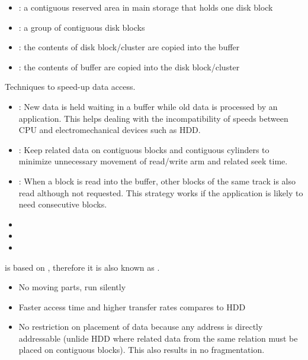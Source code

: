     \begin{itemize}
      \item {}: a contiguous reserved area in main storage that holds one disk block
      \item {}: a group of contiguous disk blocks
      \item {}: the contents of disk block/cluster are copied into the buffer
      \item {}: the contents of buffer are copied into the disk block/cluster
    \end{itemize}

    \par Techniques to speed-up data access.
    \begin{itemize}
      \item {}: New data is held waiting in a buffer while old data is processed by an application. This helps dealing with the incompatibility of speeds between CPU and electromechanical devices such as HDD.
      \item {}: Keep related data on contiguous blocks and contiguous cylinders to minimize unnecessary movement of read/write arm and related seek time.
      \item {}: When a block is read into the buffer, other blocks of the same track is also read although not requested. This strategy works if the application is likely to need consecutive blocks.
      \item {}
      \item {}
      \item {}
    \end{itemize}
  
    \par {} is based on , therefore it is also known as .
    \par {}
    \begin{itemize}
      \item No moving parts, run silently
      \item Faster access time and higher transfer rates compares to HDD
      \item No restriction on placement of data because any address is directly addressable (unlide HDD where related data from the same relation must be placed on contiguous blocks). This also results in no fragmentation.
    \end{itemize}
  
